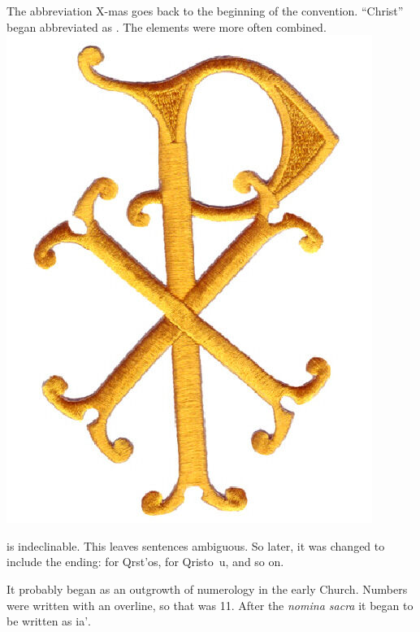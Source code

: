 \documentclass[aspectratio=169]{beamer}
\begin{document}
\begin{frame}
  \begin{multicols}{2}
	The abbreviation X-mas goes back to the beginning of the convention.
	``Christ'' began abbreviated as .
	The elements were more often combined.
  \columnbreak
	\includegraphics[scale=.5]{chirho.jpg}
  \end{multicols}
\end{frame}

\begin{frame}
   is indeclinable.
  This leaves sentences ambiguous.
  So later, it was changed to include the ending:  for \textgreek{Qrst'os},  for Qristo~u, and so on.
\end{frame}

\begin{frame}
  It probably began as an outgrowth of numerology in the early Church.
  Numbers were written with an overline, so that  was 11.
  After the \emph{nomina sacra} it began to be written as \textgreek{ia'}.
\end{frame}
\end{document}
